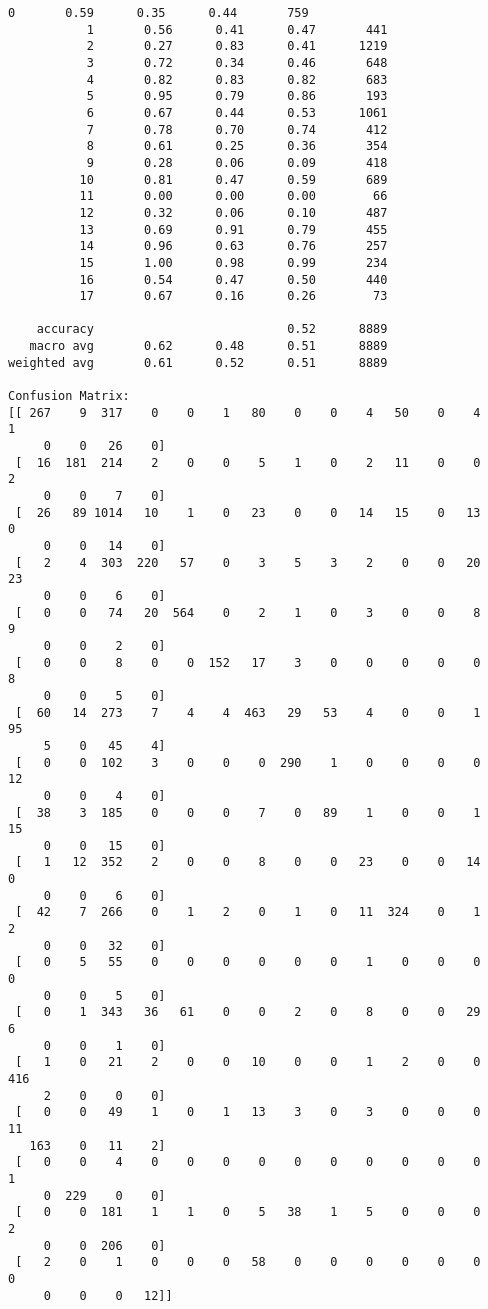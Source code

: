 \documentclass[11pt]{article}
\begin{document}
\begin{Verbatim}[commandchars=\\\{\}]
           0       0.59      0.35      0.44       759
           1       0.56      0.41      0.47       441
           2       0.27      0.83      0.41      1219
           3       0.72      0.34      0.46       648
           4       0.82      0.83      0.82       683
           5       0.95      0.79      0.86       193
           6       0.67      0.44      0.53      1061
           7       0.78      0.70      0.74       412
           8       0.61      0.25      0.36       354
           9       0.28      0.06      0.09       418
          10       0.81      0.47      0.59       689
          11       0.00      0.00      0.00        66
          12       0.32      0.06      0.10       487
          13       0.69      0.91      0.79       455
          14       0.96      0.63      0.76       257
          15       1.00      0.98      0.99       234
          16       0.54      0.47      0.50       440
          17       0.67      0.16      0.26        73

    accuracy                           0.52      8889
   macro avg       0.62      0.48      0.51      8889
weighted avg       0.61      0.52      0.51      8889

Confusion Matrix:
[[ 267    9  317    0    0    1   80    0    0    4   50    0    4    1
     0    0   26    0]
 [  16  181  214    2    0    0    5    1    0    2   11    0    0    2
     0    0    7    0]
 [  26   89 1014   10    1    0   23    0    0   14   15    0   13    0
     0    0   14    0]
 [   2    4  303  220   57    0    3    5    3    2    0    0   20   23
     0    0    6    0]
 [   0    0   74   20  564    0    2    1    0    3    0    0    8    9
     0    0    2    0]
 [   0    0    8    0    0  152   17    3    0    0    0    0    0    8
     0    0    5    0]
 [  60   14  273    7    4    4  463   29   53    4    0    0    1   95
     5    0   45    4]
 [   0    0  102    3    0    0    0  290    1    0    0    0    0   12
     0    0    4    0]
 [  38    3  185    0    0    0    7    0   89    1    0    0    1   15
     0    0   15    0]
 [   1   12  352    2    0    0    8    0    0   23    0    0   14    0
     0    0    6    0]
 [  42    7  266    0    1    2    0    1    0   11  324    0    1    2
     0    0   32    0]
 [   0    5   55    0    0    0    0    0    0    1    0    0    0    0
     0    0    5    0]
 [   0    1  343   36   61    0    0    2    0    8    0    0   29    6
     0    0    1    0]
 [   1    0   21    2    0    0   10    0    0    1    2    0    0  416
     2    0    0    0]
 [   0    0   49    1    0    1   13    3    0    3    0    0    0   11
   163    0   11    2]
 [   0    0    4    0    0    0    0    0    0    0    0    0    0    1
     0  229    0    0]
 [   0    0  181    1    1    0    5   38    1    5    0    0    0    2
     0    0  206    0]
 [   2    0    1    0    0    0   58    0    0    0    0    0    0    0
     0    0    0   12]]
    \end{Verbatim}
\end{document}
